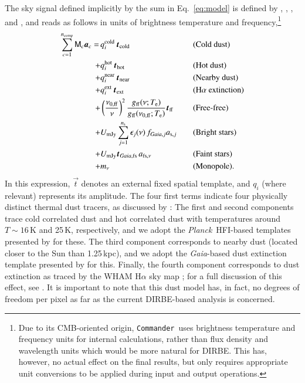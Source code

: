 \documentclass{aa}
\def\commander{\texttt{Commander}}
\def\Planck{\textit{Planck}}
\def\GAIA{\textit{Gaia}}
\def\gaia{\textit{Gaia}}
\newcommand{\CII}{\ensuremath{\textsc{C\,ii}}}
\renewcommand{\t}[0]{\vec{t}}
\renewcommand{\a}[0]{\vec{a}}
\newcommand{\M}[0]{\tens{M}}
\newcommand{\Te}[0]{T_{\rm e}}
\def\nuzeroff{\ifmmode \nu_{0,\mathrm{ff}}\else $\nu_{0,\mathrm{ff}}$\fi}
\def\Te{\ifmmode T_{\mathrm{e}}\else $T_{\mathrm{e}}$\fi}
\begin{document}
The sky signal defined implicitly by the sum in Eq.~\eqref{eq:model}
is defined by \citet{CG02_04}, \citet{CG02_05}, \citet{CG02_06}, and \citet{CG02_07}, and reads as follows in units
of brightness temperature and frequency,\footnote{Due to its
CMB-oriented origin, \commander\ uses brightness temperature and
frequency units for internal calculations, rather than flux density
and wavelength units which would be more natural for DIRBE. This has,
however, no actual effect on the final results, but only requires
appropriate unit conversions to be applied during input and output
operations. }
\begin{alignat}{4}
  \sum_{c=1}^{n_{\mathrm{comp}}} \M_c \a_c  = \,
  &q^{\mathrm{cold}}_i\,\t_{\mathrm{cold}}
  && \textrm{(Cold dust)}\nonumber\\ %
  + &q_i^{\mathrm{hot}}\,
  \t_{\mathrm{hot}} && \textrm{(Hot dust)}\nonumber \\
  + &q_i^{\mathrm{near}}\, \t_{\mathrm{near}}
 && \textrm{(Nearby dust)} \nonumber \\
  + &q_i^{\mathrm{ext}}\,\t_{\mathrm{ext}}
  && \textrm{(H${\alpha}$ extinction)}\nonumber\\ %
  + &\left(\frac{\nuzeroff}{\nu}\right)^2
  \frac{g_{\mathrm{ff}}(\nu;\Te) }{g_{\mathrm{ff}}(\nuzeroff;\Te)}
  \vec{t}_{\mathrm{ff}} && \textrm{(Free-free)} \nonumber\\
  + &U_{\mathrm{mJy}} \sum_{j=1}^{n_{\mathrm{s}}}
  \epsilon_j(\nu)\,f_{\GAIA,j} a_{\mathrm{s},j} &\quad&
  \textrm{(Bright stars)} \nonumber\\
  + &U_{\mathrm{mJy}} \t_{\gaia,\mathrm{fs}}\, a_{\mathrm{fs},\nu} &\quad&
  \textrm{(Faint stars)} \nonumber\\  
  + &m_{\nu} && \textrm{(Monopole)}. %
\end{alignat}
In this expression, $\t$ denotes an external fixed spatial template, and $q_i$ (where relevant) represents its amplitude. The four first terms indicate four physically distinct thermal dust tracers, as discussed by \citet{CG02_05}: The first and second components trace cold  correlated dust and hot  correlated dust with temperatures around $T\sim16\,\mathrm{K}$ and  25\,K, respectively, and we adopt the \Planck\ HFI-based templates presented by \citet{CG02_06} for these. The third component corresponds to nearby dust (located closer to the Sun than 1.25\,kpc), and we adopt the \GAIA-based dust extinction template presented by \citet{edenhofer:2024} for this. Finally, the fourth component corresponds to dust extinction as traced by the WHAM H$\alpha$ sky map \citep{wham:2003}; for a full discussion of this effect, see \citet{CG02_07}. It is important to note that this dust model has, in fact, no degrees of freedom per pixel as far as the current DIRBE-based analysis is concerned. 
\end{document}
